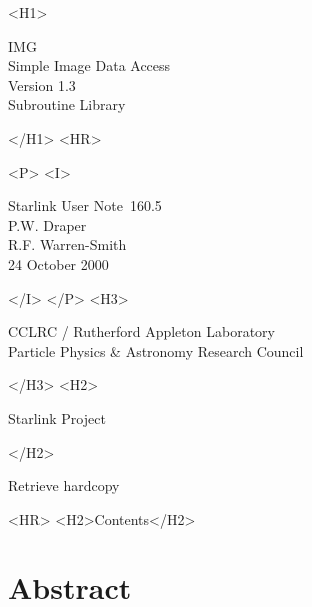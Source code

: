 \documentclass[twoside,11pt]{article}
\newcommand{\stardoccategory}  {Starlink User Note}
\newcommand{\stardocsource}    {sun\stardocnumber}
\newcommand{\stardocnumber}    {160.5}
\newcommand{\stardocauthors}   {P.W. Draper \\
                                R.F. Warren-Smith}
\newcommand{\stardocdate}      {24 October 2000}
\newcommand{\stardoctitle}     {IMG \\ [1ex]
                                Simple Image Data Access}
\newcommand{\stardocversion}   {Version 1.3}
\newcommand{\stardocmanual}    {Subroutine Library}
\newcommand{\htmladdnormallink}[2]{#1}
\newcommand{\htmladdimg}[1]{}
\newcommand{\htmlref}[2]{#1}
\newcommand{\htmladdtonavigation}[1]{}
\newcommand{\xlabel}[1]{}
\renewcommand{\_}{\texttt{\symbol{95}}}
\begin{document}
\begin{htmlonly}
   \xlabel{}
   \begin{rawhtml} <H1> \end{rawhtml}
      \stardoctitle\\
      \stardocversion\\
      \stardocmanual
   \begin{rawhtml} </H1> <HR> \end{rawhtml}


   \begin{rawhtml} <P> <I> \end{rawhtml}
   \stardoccategory\ \stardocnumber \\
   \stardocauthors \\
   \stardocdate
   \begin{rawhtml} </I> </P> <H3> \end{rawhtml}
      \htmladdnormallink{CCLRC / Rutherford Appleton Laboratory}
                        {http://www.cclrc.ac.uk} \\
      \htmladdnormallink{Particle Physics \& Astronomy Research Council}
                        {http://www.pparc.ac.uk} \\
   \begin{rawhtml} </H3> <H2> \end{rawhtml}
      \htmladdnormallink{Starlink Project}{http://www.starlink.rl.ac.uk/}
   \begin{rawhtml} </H2> \end{rawhtml}
   \htmladdnormallink{\htmladdimg{source.gif} Retrieve hardcopy}
      {http://www.starlink.rl.ac.uk/cgi-bin/hcserver?\stardocsource}\\

  \label{stardoccontents}
  \begin{rawhtml} 
    <HR>
    <H2>Contents</H2>
  \end{rawhtml}
  \htmladdtonavigation{\htmlref{\htmladdimg{contents_motif.gif}}
        {stardoccontents}}

  \section{\xlabel{abstract}Abstract}
\end{htmlonly}
\end{document}
